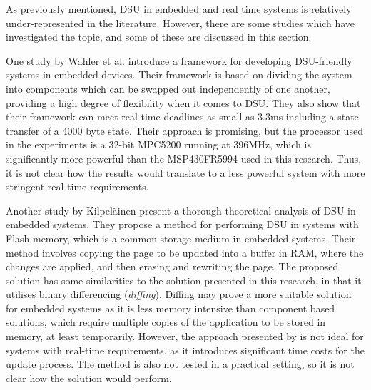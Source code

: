 As previously mentioned, DSU in embedded and real time systems is relatively under-represented in the literature. However, there are some studies which have investigated the topic, and some of these are discussed in this section.

One study by Wahler et al. \cite{dynUpdateFramework} introduce a framework for developing DSU-friendly systems in embedded devices. Their framework is based on dividing the system into components which can be swapped out independently of one another, providing a high degree of flexibility when it comes to DSU. They also show that their framework can meet real-time deadlines as small as 3.3ms including a state transfer of a  4000 byte state.  Their approach is promising, but the processor used in the experiments is a 32-bit MPC5200 running at 396MHz, which is significantly more powerful than the MSP430FR5994 used in this research. Thus, it is not clear how the results would translate to a less powerful system with more stringent real-time requirements.

Another study by Kilpeläinen \cite{Kilpelainen2023} present a thorough theoretical analysis of DSU in embedded systems. They propose a method for performing DSU in systems with Flash memory, which is a common storage medium in embedded systems. Their method involves copying the page to be updated into a buffer in RAM, where the changes are applied, and then erasing and rewriting the page. The proposed solution has some similarities to the solution presented in this research, in that it utilises binary differencing (\textit{diffing}). Diffing may prove a more suitable solution for embedded systems as it is less memory intensive than component based solutions, which require multiple copies of the application to be stored in memory, at least temporarily. However, the approach presented by \cite{Kilpelainen2023} is not ideal for systems with real-time requirements, as it introduces significant time costs for the update process. The method is also not tested in a practical setting, so it is not clear how the solution would perform. 

